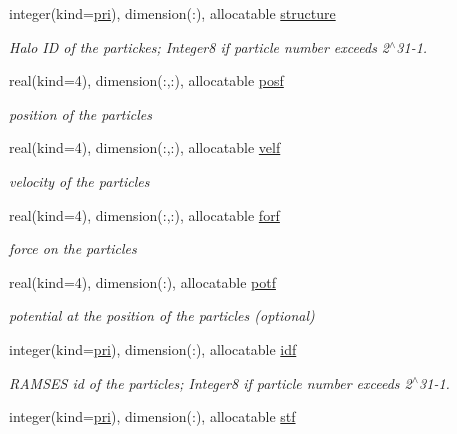 \begin{DoxyCompactItemize}
integer(kind=\hyperlink{namespacemodvariables_a51e0b900e05f4302a36ddf33b6df0649}{pri}), dimension(\+:), allocatable \hyperlink{namespacemodvariables_a93c25eb46b5370bd8153733e03f3008d}{structure}
\begin{DoxyCompactList}\small\item\em Halo ID of the partickes; Integer8 if particle number exceeds 2$^\wedge$31-\/1. \end{DoxyCompactList}\item 
real(kind=4), dimension(\+:,\+:), allocatable \hyperlink{namespacemodvariables_a7528c234a190760e036921b956ec9fe8}{posf}
\begin{DoxyCompactList}\small\item\em position of the particles \end{DoxyCompactList}\item 
real(kind=4), dimension(\+:,\+:), allocatable \hyperlink{namespacemodvariables_a99c2bd91d22daa7bfaa3491624db7f14}{velf}
\begin{DoxyCompactList}\small\item\em velocity of the particles \end{DoxyCompactList}\item 
real(kind=4), dimension(\+:,\+:), allocatable \hyperlink{namespacemodvariables_a1f2453280a3af1c380a1c3ad4797dc4b}{forf}
\begin{DoxyCompactList}\small\item\em force on the particles \end{DoxyCompactList}\item 
real(kind=4), dimension(\+:), allocatable \hyperlink{namespacemodvariables_a719beead34fb4c6c7c70e7f51f1dfc78}{potf}
\begin{DoxyCompactList}\small\item\em potential at the position of the particles (optional) \end{DoxyCompactList}\item 
integer(kind=\hyperlink{namespacemodvariables_a51e0b900e05f4302a36ddf33b6df0649}{pri}), dimension(\+:), allocatable \hyperlink{namespacemodvariables_a74cd7fb485e34ae685664db5b2629aa9}{idf}
\begin{DoxyCompactList}\small\item\em R\+A\+M\+S\+ES id of the particles; Integer8 if particle number exceeds 2$^\wedge$31-\/1. \end{DoxyCompactList}\item 
integer(kind=\hyperlink{namespacemodvariables_a51e0b900e05f4302a36ddf33b6df0649}{pri}), dimension(\+:), allocatable \hyperlink{namespacemodvariables_a5b99e0cc82073c06969e0fe6caa06357}{stf}

\end{DoxyCompactItemize}
